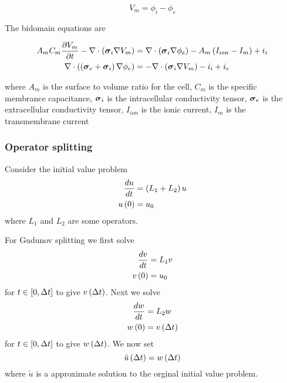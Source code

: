\begin{equation}
  V_{m}=\phi_{i}-\phi_{e}
  \label{eqn:transmembranevoltage}
\end{equation} 

The bidomain equations are

\begin{align}
  A_{m}C_{m} \dfrac{\partial V_{m}}{\partial t} - \nabla\cdot\left( \boldsymbol{\sigma}_{i}\nabla{V_{m}} \right) &= \nabla\cdot\left( \boldsymbol{\sigma}_{i}\nabla{\phi_{e}} \right) -A_{m}\left( I_{ion}-I_{m} \right)+i_{i} \label{eqn:biodomain1}
  \\
   \nabla\cdot\left( \left( \boldsymbol{\sigma}_{e}+\boldsymbol{\sigma}_{i} \right)\nabla{\phi_{e}} \right) &=- \nabla\cdot\left( \boldsymbol{\sigma}_{i}\nabla{V_{m}} \right) -i_{i}+i_{e}
  \label{eqn:bidomain2}
\end{align}

where $A_{m}$ is the surface to volume ratio for the cell, $C_{m}$ is
the specific membrance capacitance, $\boldsymbol{\sigma}_{i}$ is the intracellular
conductivity tensor, $\boldsymbol{\sigma}_{e}$ is the extracellular
conductivity tensor, $I_{ion}$ is the ionic current, $I_{m}$ is the
transmembrane current

\subsubsection{Operator splitting}

Consider the initial value problem
\begin{align}
   \dfrac{ d u}{d t} &=\left( L_{1}+L_{2} \right)u \\
   u\left( 0 \right) &=u_{0}
\end{align}
where $L_{1}$ and $L_{2}$ are some operators.

For Gudunov splitting we first solve
\begin{align}
   \dfrac{ d v}{d t} &=L_{1}v \\
   v\left( 0 \right) &=u_{0}
\end{align}
for $t\in\left[ 0,\Delta t \right]$ to give $ v\left( \Delta t \right) $. Next we solve
\begin{align}
   \dfrac{ d w}{d t} &=L_{2}w \\
   w\left( 0 \right) &= v\left( \Delta t \right) 
\end{align}
for $t\in\left[ 0,\Delta t \right]$ to give $ w\left( \Delta t \right) $. We now set
\begin{equation}
 \tilde{u}\left( \Delta t \right) = w\left( \Delta t \right) 
\end{equation}
where $\tilde{u}$ is a approximate solution to the orginal initial value
problem.

